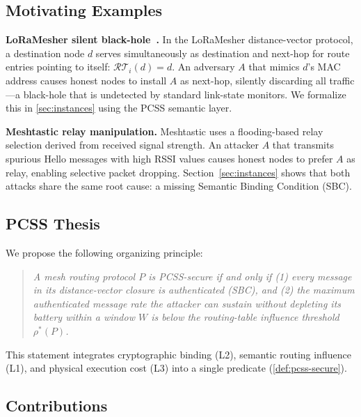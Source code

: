 \documentclass[journal,compsoc]{IEEEtran}
\theoremstyle{plain}
\theoremstyle{definition}
\theoremstyle{remark}
\newcommand{\rhostar}{\rho^*}
\begin{document}
\subsection{Motivating Examples}

\textbf{LoRaMesher silent black-hole~\cite{loramesherpaper}.}
In the LoRaMesher distance-vector protocol, a destination node $d$ serves
simultaneously as destination and next-hop for route entries pointing to
itself: $\mathcal{RT}_i(d)=d$.  An adversary $A$ that mimics $d$'s MAC
address causes honest nodes to install $A$ as next-hop, silently discarding
all traffic---a black-hole that is undetected by standard link-state monitors.
We formalize this in \cref{sec:instances} using the PCSS semantic layer.

\textbf{Meshtastic relay manipulation.}
Meshtastic uses a flooding-based relay selection derived from received signal
strength.  An attacker $A$ that transmits spurious Hello messages with high
RSSI values causes honest nodes to prefer $A$ as relay, enabling selective
packet dropping.  Section~\ref{sec:instances} shows that both attacks share
the same root cause: a missing Semantic Binding Condition (SBC).

\subsection{PCSS Thesis}

We propose the following organizing principle:
\begin{quote}
\emph{A mesh routing protocol $P$ is PCSS-secure if and only if (1) every
message in its distance-vector closure is authenticated (SBC), and (2) the
maximum authenticated message rate the attacker can sustain without
depleting its battery within a window $W$ is below the routing-table
influence threshold $\rhostar(P)$.}
\end{quote}

This statement integrates cryptographic binding (L2), semantic routing
influence (L1), and physical execution cost (L3) into a single predicate
(\cref{def:pcss-secure}).

\subsection{Contributions}
\end{document}
